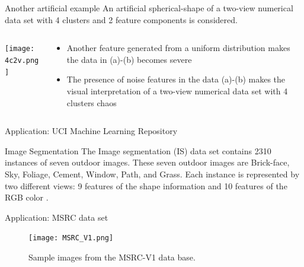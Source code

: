 \documentclass[compress,sky blue]{beamer}
\begin{document}
\begin{frame}{Another artificial example }
An artificial spherical-shape of a two-view numerical data set with 4 clusters and 2 feature components is considered. 

\begin{columns}
  \begin{column}{0.3\textwidth}
    \begin{center}
     \texttt{[image: 4c2v.png]}
     \end{center}
  \end{column}
  \begin{column}{0.7\textwidth}  %
    \begin{itemize}
	  \item Another feature generated from a uniform distribution makes the data in (a)-(b) becomes severe
\item The presence of noise features in the data (a)-(b) makes the visual interpretation of a two-view numerical data set with 4 clusters chaos 
	\end{itemize}
  \end{column}
\end{columns}

\end{frame}


\begin{frame}{Application: UCI Machine Learning Repository }

\begin{exampleblock}{Image Segmentation}
 The Image segmentation (IS) data set contains \alert{2310} instances of seven outdoor images. These \alert{seven} outdoor images are Brick-face, Sky, Foliage, Cement, Window, Path, and Grass. Each instance is represented by \alert{two} different views: \alert{9} features of the shape information and \alert{10} features of the RGB color \cite{27C.L.Blake1998UCISets}. 
\end{exampleblock}

\end{frame}


\begin{frame}{Application: MSRC data set }
\vspace{-0.6cm}	

\begin{figure}
\texttt{[image: MSRC\_V1.png]}
  \caption{\label{fig:your-figure}Sample images from the MSRC-V1 data base.}
\end{figure}

\end{frame}
\end{document}
